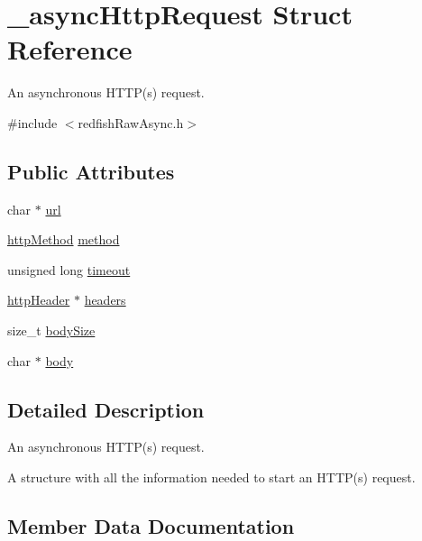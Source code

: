 \hypertarget{struct__asyncHttpRequest}{}\section{\+\_\+async\+Http\+Request Struct Reference}
\label{struct__asyncHttpRequest}


An asynchronous H\+T\+T\+P(s) request.  




{\ttfamily \#include $<$redfish\+Raw\+Async.\+h$>$}

\subsection*{Public Attributes}
\begin{DoxyCompactItemize}
\item 
char $\ast$ \hyperlink{struct__asyncHttpRequest_ade18f96cd3e2cb3395dd978597283a9f}{url}
\item 
\hyperlink{redfishRawAsync_8h_a15f26ab1ae1b376c50b78e58ded397be}{http\+Method} \hyperlink{struct__asyncHttpRequest_a43ee659ce0011d76e6e06af3a02f7ee2}{method}
\item 
unsigned long \hyperlink{struct__asyncHttpRequest_a471f8b6fb269a1efc9f79c6dd530ed69}{timeout}
\item 
\hyperlink{redfishRawAsync_8h_a3ee36950587f4749a62b080e3e157280}{http\+Header} $\ast$ \hyperlink{struct__asyncHttpRequest_a9c9afff85d7852ab125cb1a8ecee5a06}{headers}
\item 
size\+\_\+t \hyperlink{struct__asyncHttpRequest_a75d8c04d93312ca23e60ad4b48903cc3}{body\+Size}
\item 
char $\ast$ \hyperlink{struct__asyncHttpRequest_ac6484f43afba5232a4346742659a7d04}{body}
\end{DoxyCompactItemize}


\subsection{Detailed Description}
An asynchronous H\+T\+T\+P(s) request. 

A structure with all the information needed to start an H\+T\+T\+P(s) request. 

\subsection{Member Data Documentation}
\mbox{\label{struct__asyncHttpRequest_ac6484f43afba5232a4346742659a7d04}} 
